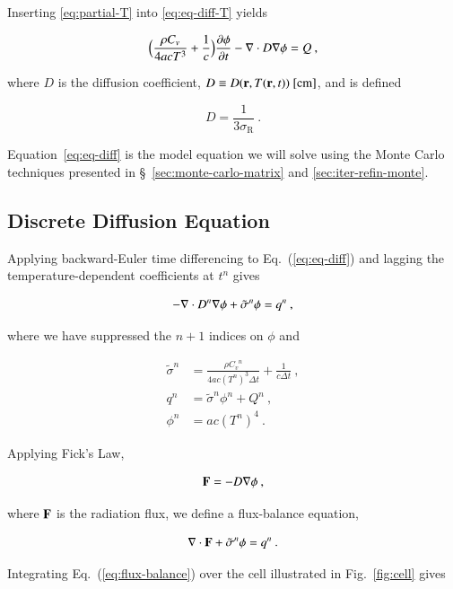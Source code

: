 \documentclass[preprint,12pt]{elsarticle}
\newcommand{\Cv}{\ensuremath{C_{v}}}
\newcommand{\ros}{\ensuremath{\sigma_{\scriptscriptstyle\mathrm{R}}}}
\newcommand{\dt}{\ensuremath{\Delta t}}
\newcommand{\sign}{\ensuremath{\tilde{\sigma}^n}}
\newcommand{\qn}{\ensuremath{q^n}}
\newcommand{\Tn}{\ensuremath{T^n}}
\newcommand{\Dn}{\ensuremath{D^n}}
\newcommand{\phin}{\ensuremath{\phi^n}}
\begin{document}
Inserting \eqref{eq:partial-T} into \eqref{eq:eq-diff-T} yields

\begin{equation}
  \label{eq:eq-diff}
  \Bigl(\frac{\rho\Cv}{4acT^{3}} + \frac{1}{c}\Bigr)\pder{\phi}{t} - 
  \nabla\cdot D\grad{\phi} = Q\:,
\end{equation}

where $D$ is the diffusion coefficient, $D\equiv
D(\mathbf{r},T(\mathbf{r},t))\ [\text{cm}]$, and is defined

\begin{equation}
  D = \frac{1}{3\ros}\:.
\end{equation}

Equation~\eqref{eq:eq-diff} is the model equation we will solve using
the Monte Carlo techniques presented in
\S~\ref{sec:monte-carlo-matrix} and \ref{sec:iter-refin-monte}.

\subsection{Discrete Diffusion Equation}

Applying backward-Euler time differencing to Eq.~(\ref{eq:eq-diff})
and lagging the temperature-dependent coefficients at $t^n$ gives

\begin{equation}
  -\nabla\cdot \Dn\grad{\phi} + \sign\phi = \qn\:,
\end{equation}

where we have suppressed the $n+1$ indices on $\phi$ and 

\begin{align}
  \sign &= \frac{\rho \Cv^n}{4ac(\Tn)^3\dt} + \frac{1}{c\dt}\:,\\
  \qn &= \sign\phin + Q^n\:,\\
  \phin &= ac(\Tn)^4\:.
\end{align}

Applying Fick's Law,

\begin{equation}
  \mathbf{F} = -D\nabla \phi\:,
  \label{eq:fick}
\end{equation}

where $\mathbf{F}$ is the radiation flux, we define a flux-balance
equation,

\begin{equation}
  \dive{F} + \sign\phi = \qn\:.
  \label{eq:flux-balance}
\end{equation}

Integrating Eq.~(\ref{eq:flux-balance}) over the cell illustrated in
Fig.~\ref{fig:cell} gives
\end{document}
